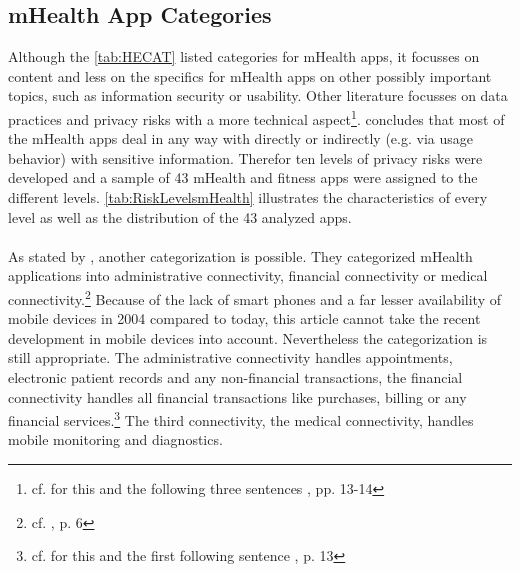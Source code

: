\subsection{mHealth App Categories}
Although the \ref{tab:HECAT} listed categories for mHealth apps, it focusses on content and less on the specifics for mHealth apps on other possibly important topics, such as information security or usability. Other literature focusses on data practices and privacy risks with a more technical aspect\footnote{cf. for this and the following three sentences \cite{Njie.2013}, pp. 13-14}. \cite{Njie.2013} concludes that most of the mHealth apps deal in any way with directly or indirectly (e.g. via usage behavior) with sensitive information. Therefor ten levels of privacy risks were developed and a sample of 43 mHealth and fitness apps were assigned to the different levels. \ref{tab:RiskLevelsmHealth} illustrates the characteristics of every level as well as the distribution of the 43 analyzed apps.
\\
\\
As stated by \cite{Istepanian.2004}, another categorization is possible. They categorized mHealth applications into administrative connectivity, financial connectivity or medical connectivity.\footnote{cf. \cite{Istepanian.2004}, p. 6} Because of the lack of smart phones and a far lesser availability of mobile devices in 2004 compared to today, this article cannot take the recent development in mobile devices into account. Nevertheless the categorization is still appropriate. The administrative connectivity handles appointments, electronic patient records and any non-financial transactions, the financial connectivity handles all financial transactions like purchases, billing or any financial services.\footnote{cf. for this and the first following sentence \cite{Istepanian.2004}, p. 13} The third connectivity, the medical connectivity, handles mobile monitoring and diagnostics.
\\
